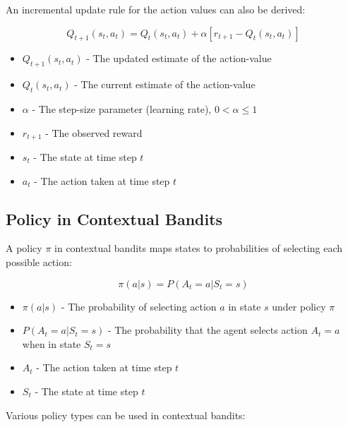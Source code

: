 \documentclass[12pt,a4paper]{article}
\begin{document}
An incremental update rule for the action values can also be derived:

\begin{equation}
Q_{t+1}(s_t,a_t) = Q_t(s_t,a_t) + \alpha [r_{t+1} - Q_t(s_t,a_t)]
\end{equation}

\begin{tcolorbox}[title=Notation Overview]
\begin{itemize}
    \item $Q_{t+1}(s_t,a_t)$ - The updated estimate of the action-value
    \item $Q_t(s_t,a_t)$ - The current estimate of the action-value
    \item $\alpha$ - The step-size parameter (learning rate), $0 < \alpha \leq 1$
    \item $r_{t+1}$ - The observed reward
    \item $s_t$ - The state at time step $t$
    \item $a_t$ - The action taken at time step $t$
\end{itemize}
\end{tcolorbox}

\subsection{Policy in Contextual Bandits}

A policy $\pi$ in contextual bandits maps states to probabilities of selecting each possible action:

\begin{equation}
\pi(a|s) = P(A_t = a | S_t = s)
\end{equation}

\begin{tcolorbox}[title=Notation Overview]
\begin{itemize}
    \item $\pi(a|s)$ - The probability of selecting action $a$ in state $s$ under policy $\pi$
    \item $P(A_t = a | S_t = s)$ - The probability that the agent selects action $A_t = a$ when in state $S_t = s$
    \item $A_t$ - The action taken at time step $t$
    \item $S_t$ - The state at time step $t$
\end{itemize}
\end{tcolorbox}

Various policy types can be used in contextual bandits:
\end{document}
